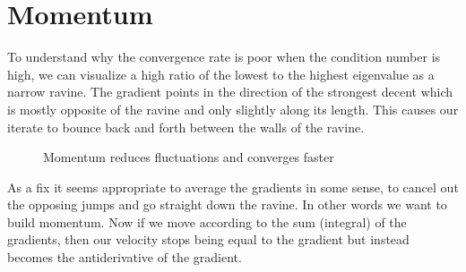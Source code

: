 
\newcommand{\momentum}{p}
\newcommand{\friction}{\mu}

\chapter{Momentum}

To understand why the convergence rate is poor when the condition
number is high, we can visualize a high ratio of the lowest to the highest
eigenvalue as a narrow ravine. The gradient points in the direction of the
strongest decent which is mostly opposite of the ravine and only slightly
along its length. This causes our iterate to bounce back and forth between
the walls of the ravine.
%
\begin{figure}[h]
	\centering
	\def\svgwidth{1\textwidth}
	
	\caption{Momentum reduces fluctuations and converges faster}
	\label{fig: visualize bad conditioning}
\end{figure}

As a fix it seems appropriate to average the gradients in some sense, to
cancel out the opposing jumps and go straight down the ravine. In other words
we want to build momentum. Now if we move according to the sum (integral) of
the gradients, then our velocity stops being equal to the gradient but instead
becomes the antiderivative of the gradient.

